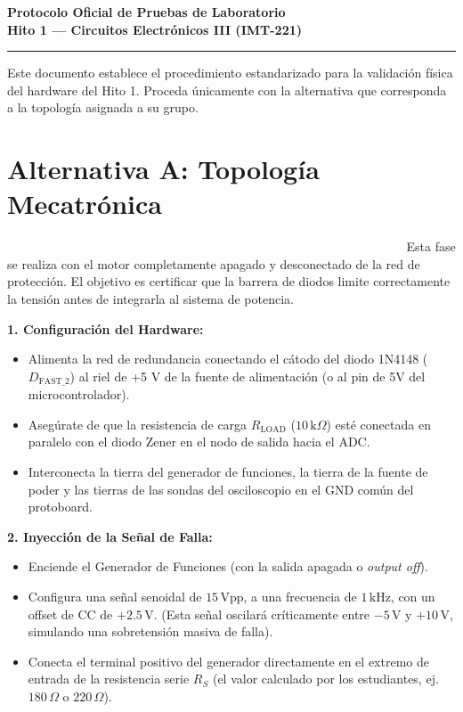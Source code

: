 \documentclass[11pt, a4paper]{article}
\newcommand{\phase}[1]{\vspace{0.4cm}\noindent\colorbox{ucbblue}{\textcolor{white}{\textbf{\large #1}}}\vspace{0.2cm}}
\newcommand{\subphase}[1]{\vspace{0.2cm}\noindent\textbf{\textcolor{ucbblue}{#1}}\vspace{0.1cm}}
\begin{document}
\begin{center}
    {\LARGE \textbf{Protocolo Oficial de Pruebas de Laboratorio}}\\[0.2cm]
    {\Large \textbf{Hito 1 — Circuitos Electrónicos III (IMT-221)}}\\[0.3cm]
    \hrule
\end{center}
\vspace{0.4cm}

Este documento establece el procedimiento estandarizado para la validación física del hardware del Hito 1. Proceda únicamente con la alternativa que corresponda a la topología asignada a su grupo.

\section*{\textcolor{ucborange}{Alternativa A: Topología Mecatrónica}}

\phase{Fase 1: Verificación de la Red de Recorte (Clamping) del ADC}
Esta fase se realiza con el motor completamente apagado y desconectado de la red de protección. El objetivo es certificar que la barrera de diodos limite correctamente la tensión antes de integrarla al sistema de potencia.

\subphase{1. Configuración del Hardware:}
\begin{itemize}[leftmargin=*]
    \item Alimenta la red de redundancia conectando el cátodo del diodo 1N4148 ($D_{\text{FAST\_2}}$) al riel de +5 V de la fuente de alimentación (o al pin de 5V del microcontrolador).
    \item Asegúrate de que la resistencia de carga $R_{\text{LOAD}}$ ($10\,\text{k}\Omega$) esté conectada en paralelo con el diodo Zener en el nodo de salida hacia el ADC.
    \item Interconecta la tierra del generador de funciones, la tierra de la fuente de poder y las tierras de las sondas del osciloscopio en el GND común del protoboard.
\end{itemize}

\subphase{2. Inyección de la Señal de Falla:}
\begin{itemize}[leftmargin=*]
    \item Enciende el Generador de Funciones (con la salida apagada o \textit{output off}).
    \item Configura una señal senoidal de $15\,\text{Vpp}$, a una frecuencia de $1\,\text{kHz}$, con un offset de CC de $+2.5\,\text{V}$. (Esta señal oscilará críticamente entre $-5\,\text{V}$ y $+10\,\text{V}$, simulando una sobretensión masiva de falla).
    \item Conecta el terminal positivo del generador directamente en el extremo de entrada de la resistencia serie $R_S$ (el valor calculado por los estudiantes, ej. $180\,\Omega$ o $220\,\Omega$).
\end{itemize}
\end{document}
